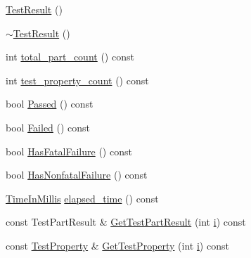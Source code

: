 \begin{DoxyCompactItemize}
\item 
\mbox{\hyperlink{classtesting_1_1_test_result_a5cf5dd6f416b7334ea601aab21a2fda5}{Test\+Result}} ()
\item 
\mbox{\hyperlink{classtesting_1_1_test_result_a41f407680b725b75d7eadc3230bc3315}{$\sim$\+Test\+Result}} ()
\item 
int \mbox{\hyperlink{classtesting_1_1_test_result_a6174aa4019dcda7c34d776b5741c9032}{total\+\_\+part\+\_\+count}} () const
\item 
int \mbox{\hyperlink{classtesting_1_1_test_result_afe4523257bbea8bc63b0950b702790be}{test\+\_\+property\+\_\+count}} () const
\item 
bool \mbox{\hyperlink{classtesting_1_1_test_result_acf7e6e72f05a0545c48ea48e7f8851df}{Passed}} () const
\item 
bool \mbox{\hyperlink{classtesting_1_1_test_result_afacc37e8b43c8574e4101bc61723c769}{Failed}} () const
\item 
bool \mbox{\hyperlink{classtesting_1_1_test_result_a30e00d4076ae07fb5ad7b623d9dc1fe4}{Has\+Fatal\+Failure}} () const
\item 
bool \mbox{\hyperlink{classtesting_1_1_test_result_a510564fa67b485ed4589a259f2a032d6}{Has\+Nonfatal\+Failure}} () const
\item 
\mbox{\hyperlink{namespacetesting_a992de1d091ce660f451d1e8b3ce30fd6}{Time\+In\+Millis}} \mbox{\hyperlink{classtesting_1_1_test_result_a717e05e00d4af5cb809433e343ab63af}{elapsed\+\_\+time}} () const
\item 
const Test\+Part\+Result \& \mbox{\hyperlink{classtesting_1_1_test_result_a910b410d0d1e066cd9e182f9e07d1933}{Get\+Test\+Part\+Result}} (int \mbox{\hyperlink{_obj__test_2lib_2googletest-master_2googlemock_2test_2gmock-matchers__test_8cc_acb559820d9ca11295b4500f179ef6392}{i}}) const
\item 
const \mbox{\hyperlink{classtesting_1_1_test_property}{Test\+Property}} \& \mbox{\hyperlink{classtesting_1_1_test_result_a491ede3939a9ca508e338929762cb148}{Get\+Test\+Property}} (int \mbox{\hyperlink{_obj__test_2lib_2googletest-master_2googlemock_2test_2gmock-matchers__test_8cc_acb559820d9ca11295b4500f179ef6392}{i}}) const
\end{DoxyCompactItemize}
